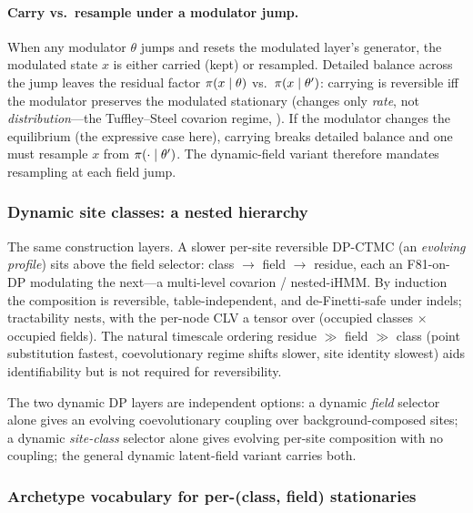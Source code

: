 \paragraph{Carry vs.\ resample under a modulator jump.}
\label{par:arch-carry-resample}
When any
modulator $\theta$ jumps and resets the modulated layer's
generator, the modulated state $x$ is either carried (kept) or
resampled. Detailed balance across the jump leaves the residual
factor $\pi(x\mid\theta)$ vs.\ $\pi(x\mid\theta')$: carrying is
reversible iff the modulator preserves the modulated stationary
(changes only \emph{rate}, not \emph{distribution}---the
Tuffley--Steel covarion regime, \citealp{tuffleysteel1998}). If the
modulator changes the equilibrium (the expressive case here),
carrying breaks detailed balance and one must resample $x$ from
$\pi(\cdot\mid\theta')$. The dynamic-field variant therefore
mandates resampling at each field jump.

\subsubsection{Dynamic site classes: a nested hierarchy}
\label{sec:dynamic-classes}

The same construction layers. A slower per-site reversible DP-CTMC
(an \emph{evolving profile}) sits above the field selector: class
$\to$ field $\to$ residue, each an F81-on-DP modulating the next---a
multi-level covarion / nested-iHMM. By induction the composition
is reversible, table-independent, and de-Finetti-safe under
indels; tractability nests, with the per-node CLV a tensor over
(occupied classes $\times$ occupied fields). The natural timescale
ordering residue $\gg$ field $\gg$ class (point substitution
fastest, coevolutionary regime shifts slower, site identity
slowest) aids identifiability but is not required for
reversibility.

The two dynamic DP layers are independent options: a dynamic
\emph{field} selector alone gives an evolving coevolutionary
coupling over background-composed sites; a dynamic
\emph{site-class} selector alone gives evolving per-site
composition with no coupling; the general dynamic latent-field
variant carries both.

\subsubsection{Archetype vocabulary for per-(class, field) stationaries}
\label{sec:archetype-suppl}

